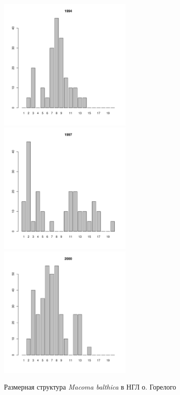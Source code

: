 \documentclass[12pt, a4paper]{article}
\begin{document}
\begin{figure}[h]
\begin{multicols}{3}
\hfill
\includegraphics[width=65mm]{../White_Sea/Luvenga_Goreliy/low_1994_.pdf}
\hfill
\includegraphics[width=65mm]{../White_Sea/Luvenga_Goreliy/low_1997_.pdf}
\hfill
\includegraphics[width=65mm]{../White_Sea/Luvenga_Goreliy/low_2000_.pdf}
\end{multicols}



\caption{Размерная структура {\it Macoma balthica} в НГЛ о. Горелого}
\label{ris:size_str_Goreliy_low}
\end{figure}
\end{document}
